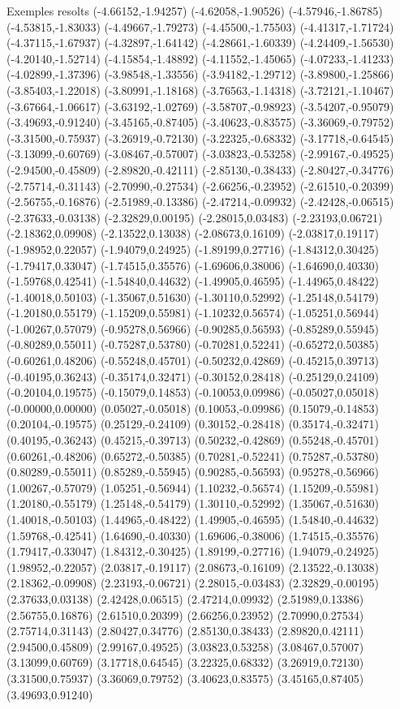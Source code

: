 \documentclass[11pt,a4paper]{article}
\begin{document}
\begin{fmex}{Exemples resolts}
(-4.66152,-1.94257) (-4.62058,-1.90526) (-4.57946,-1.86785) (-4.53815,-1.83033) (-4.49667,-1.79273) (-4.45500,-1.75503) (-4.41317,-1.71724) (-4.37115,-1.67937) (-4.32897,-1.64142) (-4.28661,-1.60339) (-4.24409,-1.56530) (-4.20140,-1.52714) (-4.15854,-1.48892) (-4.11552,-1.45065) (-4.07233,-1.41233) (-4.02899,-1.37396) (-3.98548,-1.33556) (-3.94182,-1.29712) (-3.89800,-1.25866) (-3.85403,-1.22018) (-3.80991,-1.18168) (-3.76563,-1.14318) (-3.72121,-1.10467) (-3.67664,-1.06617) (-3.63192,-1.02769) (-3.58707,-0.98923) (-3.54207,-0.95079) (-3.49693,-0.91240) (-3.45165,-0.87405) (-3.40623,-0.83575) (-3.36069,-0.79752) (-3.31500,-0.75937) (-3.26919,-0.72130) (-3.22325,-0.68332) (-3.17718,-0.64545) (-3.13099,-0.60769) (-3.08467,-0.57007) (-3.03823,-0.53258) (-2.99167,-0.49525) (-2.94500,-0.45809) (-2.89820,-0.42111) (-2.85130,-0.38433) (-2.80427,-0.34776) (-2.75714,-0.31143) (-2.70990,-0.27534) (-2.66256,-0.23952) (-2.61510,-0.20399) (-2.56755,-0.16876) (-2.51989,-0.13386) (-2.47214,-0.09932) (-2.42428,-0.06515) (-2.37633,-0.03138) (-2.32829,0.00195) (-2.28015,0.03483) (-2.23193,0.06721) (-2.18362,0.09908) (-2.13522,0.13038) (-2.08673,0.16109) (-2.03817,0.19117) (-1.98952,0.22057) (-1.94079,0.24925) (-1.89199,0.27716) (-1.84312,0.30425) (-1.79417,0.33047) (-1.74515,0.35576) (-1.69606,0.38006) (-1.64690,0.40330) (-1.59768,0.42541) (-1.54840,0.44632) (-1.49905,0.46595) (-1.44965,0.48422) (-1.40018,0.50103) (-1.35067,0.51630) (-1.30110,0.52992) (-1.25148,0.54179) (-1.20180,0.55179) (-1.15209,0.55981) (-1.10232,0.56574) (-1.05251,0.56944) (-1.00267,0.57079) (-0.95278,0.56966) (-0.90285,0.56593) (-0.85289,0.55945) (-0.80289,0.55011) (-0.75287,0.53780) (-0.70281,0.52241) (-0.65272,0.50385) (-0.60261,0.48206) (-0.55248,0.45701) (-0.50232,0.42869) (-0.45215,0.39713) (-0.40195,0.36243) (-0.35174,0.32471) (-0.30152,0.28418) (-0.25129,0.24109) (-0.20104,0.19575) (-0.15079,0.14853) (-0.10053,0.09986) (-0.05027,0.05018) (-0.00000,0.00000) (0.05027,-0.05018) (0.10053,-0.09986) (0.15079,-0.14853) (0.20104,-0.19575) (0.25129,-0.24109) (0.30152,-0.28418) (0.35174,-0.32471) (0.40195,-0.36243) (0.45215,-0.39713) (0.50232,-0.42869) (0.55248,-0.45701) (0.60261,-0.48206) (0.65272,-0.50385) (0.70281,-0.52241) (0.75287,-0.53780) (0.80289,-0.55011) (0.85289,-0.55945) (0.90285,-0.56593) (0.95278,-0.56966) (1.00267,-0.57079) (1.05251,-0.56944) (1.10232,-0.56574) (1.15209,-0.55981) (1.20180,-0.55179) (1.25148,-0.54179) (1.30110,-0.52992) (1.35067,-0.51630) (1.40018,-0.50103) (1.44965,-0.48422) (1.49905,-0.46595) (1.54840,-0.44632) (1.59768,-0.42541) (1.64690,-0.40330) (1.69606,-0.38006) (1.74515,-0.35576) (1.79417,-0.33047) (1.84312,-0.30425) (1.89199,-0.27716) (1.94079,-0.24925) (1.98952,-0.22057) (2.03817,-0.19117) (2.08673,-0.16109) (2.13522,-0.13038) (2.18362,-0.09908) (2.23193,-0.06721) (2.28015,-0.03483) (2.32829,-0.00195) (2.37633,0.03138) (2.42428,0.06515) (2.47214,0.09932) (2.51989,0.13386) (2.56755,0.16876) (2.61510,0.20399) (2.66256,0.23952) (2.70990,0.27534) (2.75714,0.31143) (2.80427,0.34776) (2.85130,0.38433) (2.89820,0.42111) (2.94500,0.45809) (2.99167,0.49525) (3.03823,0.53258) (3.08467,0.57007) (3.13099,0.60769) (3.17718,0.64545) (3.22325,0.68332) (3.26919,0.72130) (3.31500,0.75937) (3.36069,0.79752) (3.40623,0.83575) (3.45165,0.87405) (3.49693,0.91240) 
\end{fmex}
\end{document}
